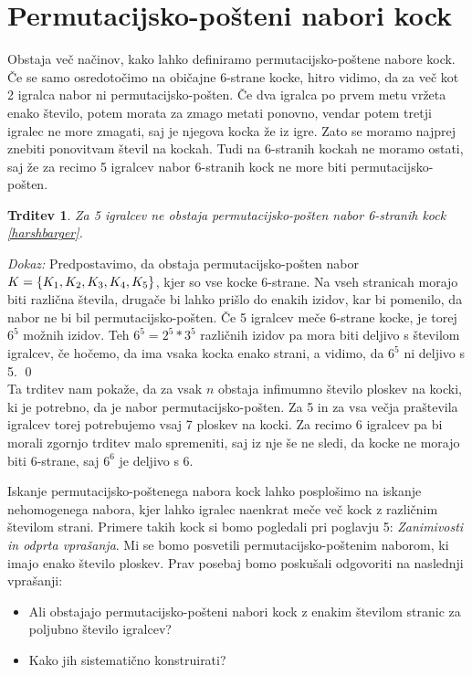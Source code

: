 \documentclass[a4paper, 12pt]{article}
\newtheorem{trditev}[definicija]{Trditev}
\begin{document}
\section{Permutacijsko-pošteni nabori kock}
Obstaja več načinov, kako lahko definiramo permutacijsko-poštene nabore kock. Če se samo osredotočimo na običajne 6-strane kocke, hitro vidimo, da za več kot 2 igralca nabor ni permutacijsko-pošten. Če dva igralca po prvem metu vržeta enako število, potem morata za zmago metati ponovno, vendar potem tretji igralec ne more zmagati, saj je njegova kocka že iz igre. Zato se moramo najprej znebiti ponovitvam števil na kockah. Tudi na 6-stranih kockah ne moramo ostati, saj že za recimo 5 igralcev nabor 6-stranih kock ne more biti permutacijsko-pošten.

\begin{trditev}
  Za 5 igralcev ne obstaja permutacijsko-pošten nabor 6-stranih kock \ref{harshbarger}.
\end{trditev}

{\em Dokaz:\/}
  Predpostavimo, da obstaja permutacijsko-pošten nabor $K = \{K_1, K_2,\\ K_3, K_4, K_5\}$, kjer so vse kocke 6-strane. Na vseh stranicah morajo biti različna števila, drugače bi lahko prišlo do enakih izidov, kar bi pomenilo, da nabor ne bi bil permutacijsko-pošten. Če 5 igralcev meče 6-strane kocke, je torej $6^5$ možnih izidov. Teh $6^5 = 2^5 * 3^5$ različnih izidov pa mora biti deljivo s številom igralcev, če hočemo, da ima vsaka kocka enako strani, a vidimo, da $6^5$ ni deljivo s 5.
\qed\\

Ta trditev nam pokaže, da za vsak $n$ obstaja infimumno število ploskev na kocki, ki je potrebno, da je nabor permutacijsko-pošten. Za 5 in za vsa večja praštevila igralcev torej potrebujemo vsaj 7 ploskev na kocki. Za recimo 6 igralcev pa bi morali zgornjo trditev malo spremeniti, saj iz nje še ne sledi, da kocke ne morajo biti 6-strane, saj $6^6$ je deljivo s 6.

Iskanje permutacijsko-poštenega nabora kock lahko posplošimo na iskanje nehomogenega nabora, kjer lahko igralec naenkrat meče več kock z različnim številom strani. Primere takih kock si bomo pogledali pri poglavju 5: {\em Zanimivosti in odprta vprašanja}. Mi se bomo posvetili permutacijsko-poštenim naborom, ki imajo enako število ploskev. Prav posebaj bomo poskušali odgovoriti na naslednji vprašanji:
\begin{itemize}
  \item Ali obstajajo permutacijsko-pošteni nabori kock z enakim številom stranic za poljubno število igralcev?
  \item Kako jih sistematično konstruirati?
\end{itemize}
\end{document}
